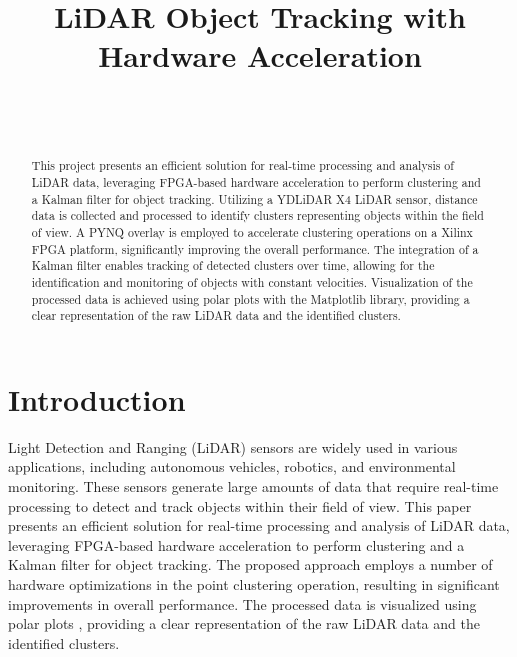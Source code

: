 \documentclass[journal]{IEEEtran} %
\begin{document}
\title{LiDAR Object Tracking with Hardware Acceleration}


\author{%
    \\%
    \\%
}

\maketitle

\begin{abstract}
This project presents an efficient solution for real-time processing and analysis of LiDAR data, leveraging FPGA-based hardware acceleration to perform clustering and a Kalman filter for object tracking. Utilizing a YDLiDAR X4 LiDAR sensor, distance data is collected and processed to identify clusters representing objects within the field of view. A PYNQ overlay is employed to accelerate clustering operations on a Xilinx FPGA platform, significantly improving the overall performance. The integration of a  Kalman filter enables tracking of detected clusters over time, allowing for the identification and monitoring of objects with constant velocities. Visualization of the processed data is achieved using polar plots with the Matplotlib library, providing a clear representation of the raw LiDAR data and the identified clusters.
\end{abstract}

\section{Introduction}
Light Detection and Ranging (LiDAR) sensors are widely used in various applications, including autonomous vehicles, robotics, and environmental monitoring. These sensors generate large amounts of data that require real-time processing to detect and track objects within their field of view. This paper presents an efficient solution for real-time processing and analysis of LiDAR data, leveraging FPGA-based hardware acceleration to perform clustering and a Kalman filter for object tracking. The proposed approach employs a number of hardware optimizations in the point clustering operation, resulting in significant improvements in overall performance. The processed data is visualized using polar plots , providing a clear representation of the raw LiDAR data and the identified clusters.
\end{document}
